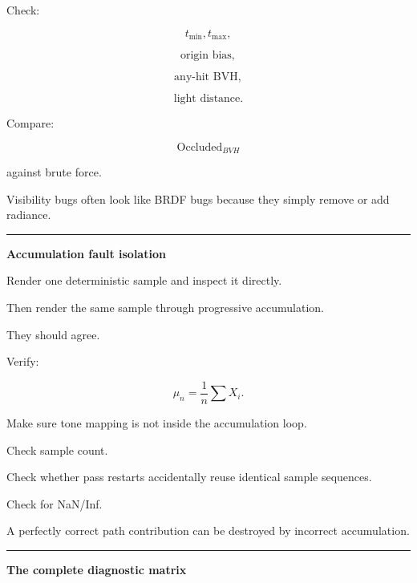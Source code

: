 Check:

\[
t_{\min},
t_{\max},
\]

\[
\text{origin bias},
\]

\[
\text{any-hit BVH},
\]

\[
\text{light distance}.
\]

Compare:

\[
\operatorname{Occluded}_{BVH}
\]

against brute force.

Visibility bugs often look like BRDF bugs because they simply remove or add radiance.

\begin{center}\rule{0.5\linewidth}{0.5pt}\end{center}

\textbf{Accumulation fault isolation}

Render one deterministic sample and inspect it directly.

Then render the same sample through progressive accumulation.

They should agree.

Verify:

\[
\mu_n=
\frac1n
\sum X_i.
\]

Make sure tone mapping is not inside the accumulation loop.

Check sample count.

Check whether pass restarts accidentally reuse identical sample sequences.

Check for NaN/Inf.

A perfectly correct path contribution can be destroyed by incorrect accumulation.

\begin{center}\rule{0.5\linewidth}{0.5pt}\end{center}

\textbf{The complete diagnostic matrix}

